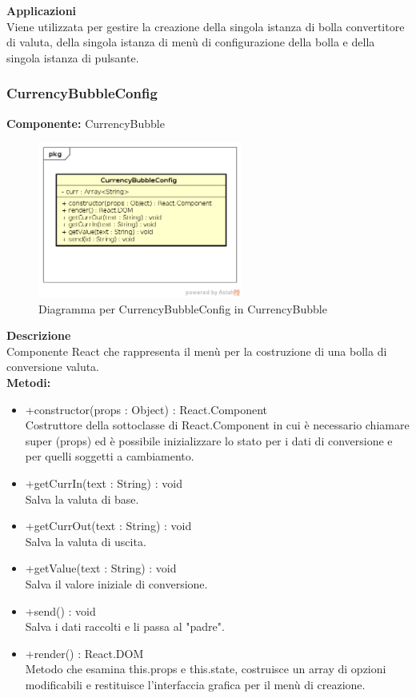 \textbf{Applicazioni}\\
Viene utilizzata per gestire la creazione della singola istanza di bolla convertitore di valuta, della singola istanza di menù di configurazione della bolla e della singola istanza di pulsante. 


\clearpage

\subsubsection{CurrencyBubbleConfig}
\textbf{Componente:}  CurrencyBubble\\
   \FloatBarrier
   \begin{figure}[ht]
   \centering
   \includegraphics[width=0.6\textwidth]{img/single-CurrencyBubbleConfig.png}
   \caption{{Diagramma per CurrencyBubbleConfig in CurrencyBubble}}
\end{figure}
\FloatBarrier
\textbf{Descrizione}\\
Componente React che rappresenta il menù per la costruzione di una bolla di conversione valuta.
\\
\textbf{Metodi:} 
\begin{itemize}
\item +constructor(props : Object) : React.Component 
\\
Costruttore della sottoclasse di React.Component in cui è necessario chiamare super (props) ed è possibile inizializzare lo stato per i dati di conversione e per quelli soggetti a cambiamento.

\item +getCurrIn(text : String) : void 
\\
Salva la valuta di base.

\item +getCurrOut(text : String) : void 
\\
Salva la valuta di uscita.

\item +getValue(text : String) : void 
\\
Salva il valore iniziale di conversione.

\item +send() : void 
\\
Salva i dati raccolti e li passa al "padre".

\item +render() : React.DOM
\\
Metodo che esamina this.props e this.state, costruisce un array di opzioni modificabili e restituisce l'interfaccia grafica per il menù di creazione.
\end{itemize}

